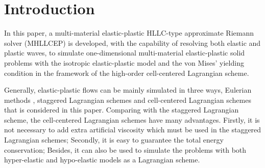 \documentclass[review]{elsarticle}
\begin{document}
\section{Introduction}

In this paper, a multi-material elastic-plastic HLLC-type \cite{toro1994restoration} approximate Riemann solver (MHLLCEP) is developed, with the capability of resolving both elastic and plastic waves, to simulate one-dimensional  multi-material elastic-plastic solid problems with the isotropic elastic-plastic model \cite{wilkins1963calculation} and  the von Mises' yielding condition in the framework of the  high-order cell-centered Lagrangian scheme.

Generally, elastic-plastic flows can be mainly simulated in three ways, Eulerian methods \cite{trangenstein1991higher,miller2001high,barton2009exact,liu2008modified}, staggered Lagrangian schemes \cite{wilkins1963calculation} and cell-centered Lagrangian schemes \cite{burton2013cell,kluth2010discretization,maire2013nominally,cheng2017third} that  is considered in this paper. Comparing with the staggered Lagrangian scheme, the cell-centered Lagrangian  schemes  have many advantages. Firstly, it is  not necessary to add  extra artificial viscosity  which  must be used in the staggered Lagrangian schemes; Secondly, it is easy to guarantee the total energy conservation; Besides, it can also be used to simulate the problems with both  hyper-elastic and hypo-elastic models  \cite{burton2013cell,kluth2010discretization,maire2013nominally,cheng2017third}  as a Lagrangian scheme.
\end{document}
